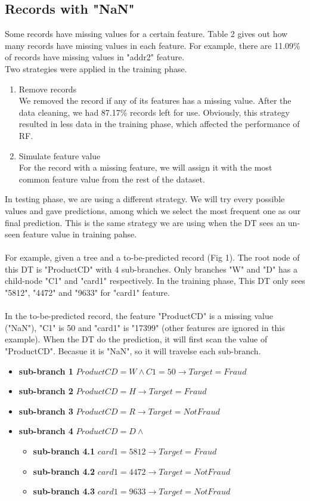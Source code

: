 \documentclass{article}
\begin{document}
\subsection{Records with "NaN"}
Some records have missing values for a certain feature. Table 2 gives out how many records have missing values in each feature. For example, there are 11.09\% of records have missing values in "addr2" feature.\\
Two strategies were applied in the training phase.
\begin{enumerate}
    \item Remove records
    \\We removed the record if any of its features has a missing value. After the data cleaning, we had 87.17\% records left for use. Obviously, this strategy resulted in less data in the training phase, which affected the performance of RF.
    \item Simulate feature value
    \\For the record with a missing feature, we will assign it with the most common feature value from the rest of the dataset. 
\end{enumerate}
In testing phase, we are using a different strategy. We will try every possible values and gave predictions, among which we select the most frequent one as our final prediction. This is the same strategy we are using when the DT sees an un-seen feature value in training pahse.\\\\
For example, given a tree and a to-be-predicted record (Fig 1). The root node of this DT is "ProductCD" with 4 sub-branches. Only branches "W" and "D" has a child-node "C1" and "card1" respectively. In the training phase, This DT only sees "5812", "4472" and "9633" for "card1" feature.\\\\  
In the to-be-predicted record, the feature "ProductCD" is a missing value ("NaN"), "C1" is 50 and "card1" is "17399" (other features are ignored in this example). When the DT do the prediction, it will first scan the value of "ProductCD". Becasue it is "NaN", so it will travelse each sub-branch. 
\begin{itemize}
    \item \textbf{sub-branch 1} $ProductCD = W \land C1 = 50\rightarrow Target = Fraud$
    \item \textbf{sub-branch 2} $ProductCD = H \rightarrow Target = Fraud$
    \item \textbf{sub-branch 3} $ProductCD = R \rightarrow Target = NotFraud$
    \item \textbf{sub-branch 4} $ProductCD = D \land$
    \begin{itemize}
        \item \textbf{sub-branch 4.1} $card1 = 5812 \rightarrow Target = Fraud$
        \item \textbf{sub-branch 4.2} $card1 = 4472 \rightarrow Target = NotFraud$
        \item \textbf{sub-branch 4.3} $card1 = 9633 \rightarrow Target = NotFraud$
    \end{itemize}
\end{itemize}
\end{document}
